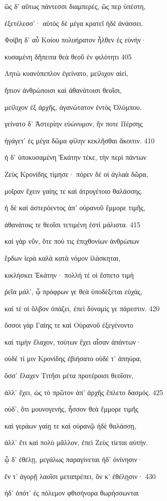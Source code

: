 ὣς δ' αὔτως πάντεσσι διαμπερές, ὥς περ ὑπέστη,

ἐξετέλεσσ'· αὐτὸς δὲ μέγα κρατεῖ ἠδὲ ἀνάσσει. 

Φοίβη δ' αὖ Κοίου πολυήρατον ἦλθεν ἐς εὐνήν· 

κυσαμένη δἤπειτα θεὰ θεοῦ ἐν φιλότητι 405 

Λητὼ κυανόπεπλον ἐγείνατο, μείλιχον αἰεί,

ἤπιον ἀνθρώποισι καὶ ἀθανάτοισι θεοῖσι, 

μείλιχον ἐξ ἀρχῆς, ἀγανώτατον ἐντὸς Ὀλύμπου.

γείνατο δ' Ἀστερίην εὐώνυμον, ἥν ποτε Πέρσης

ἠγάγετ' ἐς μέγα δῶμα φίλην κεκλῆσθαι ἄκοιτιν. 410

ἡ δ' ὑποκυσαμένη Ἑκάτην τέκε, τὴν περὶ πάντων 

Ζεὺς Κρονίδης τίμησε· πόρεν δέ οἱ ἀγλαὰ δῶρα, 

μοῖραν ἔχειν γαίης τε καὶ ἀτρυγέτοιο θαλάσσης.

ἡ δὲ καὶ ἀστερόεντος ἀπ' οὐρανοῦ ἔμμορε τιμῆς, 

ἀθανάτοις τε θεοῖσι τετιμένη ἐστὶ μάλιστα. 415

καὶ γὰρ νῦν, ὅτε πού τις ἐπιχθονίων ἀνθρώπων

ἔρδων ἱερὰ καλὰ κατὰ νόμον ἱλάσκηται,

κικλήσκει Ἑκάτην· πολλή τέ οἱ ἔσπετο τιμὴ 

ῥεῖα μάλ', ᾧ πρόφρων γε θεὰ ὑποδέξεται εὐχάς,

καί τέ οἱ ὄλβον ὀπάζει, ἐπεὶ δύναμίς γε πάρεστιν. 420

ὅσσοι γὰρ Γαίης τε καὶ Οὐρανοῦ ἐξεγένοντο

καὶ τιμὴν ἔλαχον, τούτων ἔχει αἶσαν ἁπάντων· 

οὐδέ τί μιν Κρονίδης ἐβιήσατο οὐδέ τ' ἀπηύρα,

ὅσσ' ἔλαχεν Τιτῆσι μέτα προτέροισι θεοῖσιν, 

ἀλλ' ἔχει, ὡς τὸ πρῶτον ἀπ' ἀρχῆς ἔπλετο δασμός. 425 

οὐδ', ὅτι μουνογενής, ἧσσον θεὰ ἔμμορε τιμῆς 

καὶ γεράων γαίῃ τε καὶ οὐρανῷ ἠδὲ θαλάσσῃ, 

ἀλλ' ἔτι καὶ πολὺ μᾶλλον, ἐπεὶ Ζεὺς τίεται αὐτήν.

ᾧ δ' ἐθέλῃ, μεγάλως παραγίνεται ἠδ' ὀνίνησιν· 

ἔν τ' ἀγορῇ λαοῖσι μεταπρέπει, ὅν κ' ἐθέλῃσιν· 430 

ἠδ' ὁπότ' ἐς πόλεμον φθισήνορα θωρήσσωνται

